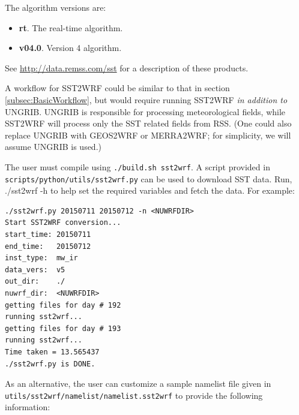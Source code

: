 The algorithm versions are:
\begin{itemize}
\item \textbf{rt}. The real-time algorithm.
\item \textbf{v04.0}. Version 4 algorithm.
\end{itemize}

See \url{http://data.remss.com/sst} for a description of these products.

A workflow for SST2WRF could be similar to that in section 
\ref{subsec:BasicWorkflow}, but would require running SST2WRF \emph{in 
addition to} UNGRIB. UNGRIB is responsible for processing meteorological 
fields, while SST2WRF will process only the SST related fields from RSS. (One 
could also replace UNGRIB with GEOS2WRF or MERRA2WRF; for simplicity, we will
assume UNGRIB is used.)

The user must compile using \texttt{./build.sh sst2wrf}. A script provided in \\
\texttt{scripts/python/utils/sst2wrf.py} can be used to download SST data. Run,
./sst2wrf -h to help set the required variables and fetch the data. For example:
\begin{verbatim}
./sst2wrf.py 20150711 20150712 -n <NUWRFDIR>
Start SST2WRF conversion...
start_time: 20150711
end_time:   20150712
inst_type:  mw_ir
data_vers:  v5
out_dir:    ./
nuwrf_dir:  <NUWRFDIR>
getting files for day # 192
running sst2wrf...
getting files for day # 193
running sst2wrf...
Time taken = 13.565437
./sst2wrf.py is DONE.
\end{verbatim}

As an alternative, the
user can customize a sample namelist file given in \\
\texttt{utils/sst2wrf/namelist/namelist.sst2wrf} to provide the 
following information:\\

